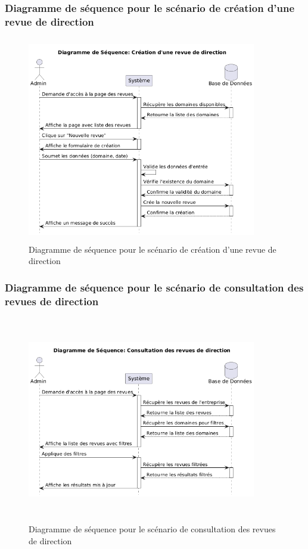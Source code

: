 \subsubsection{Diagramme de séquence pour le scénario de création d'une revue de direction}
\begin{figure}[H]
    \centering
    \includegraphics[width=10cm,height=9cm]{images/createrevueseq.png}
    \caption{Diagramme de séquence pour le scénario de création d'une revue de direction}
\end{figure}

\subsubsection{Diagramme de séquence pour le scénario de consultation des revues de direction}
\begin{figure}[H]
    \centering
    \includegraphics[width=10cm,height=9cm]{images/consultrevueseq.png}
    \caption{Diagramme de séquence pour le scénario de consultation des revues de direction}
\end{figure}

